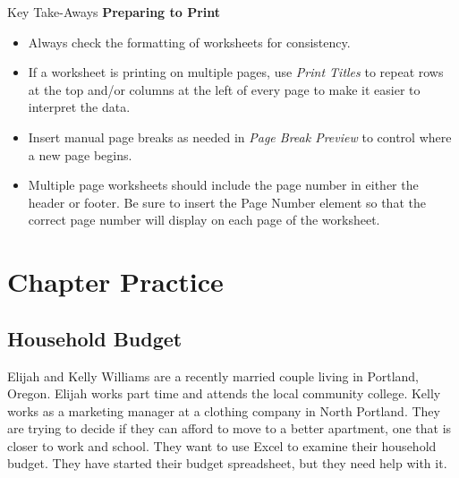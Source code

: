 \begin{center}
	\begin{tkwbox}{Key Take-Aways}
		\textbf{Preparing to Print}
		\\
		\begin{itemize}
			\setlength{\itemsep}{0pt}
			\setlength{\parskip}{0pt}
			\setlength{\parsep}{0pt}

			\item Always check the formatting of worksheets for consistency.
			\item If a worksheet is printing on multiple pages, use \textit{Print Titles} to repeat rows at the top and/or columns at the left of every page to make it easier to interpret the data.
			\item Insert manual page breaks as needed in \textit{Page Break Preview} to control where a new page begins.
			\item Multiple page worksheets should include the page number in either the header or footer. Be sure to insert the Page Number element so that the correct page number will display on each page of the worksheet.
			
		\end{itemize}
	\end{tkwbox}
\end{center}

\section{Chapter Practice}

\subsection{Household Budget}

Elijah and Kelly Williams are a recently married couple living in Portland, Oregon. Elijah works part time and attends the local community college. Kelly works as a marketing manager at a clothing company in North Portland. They are trying to decide if they can afford to move to a better apartment, one that is closer to work and school. They want to use Excel to examine their household budget. They have started their budget spreadsheet, but they need help with it.

